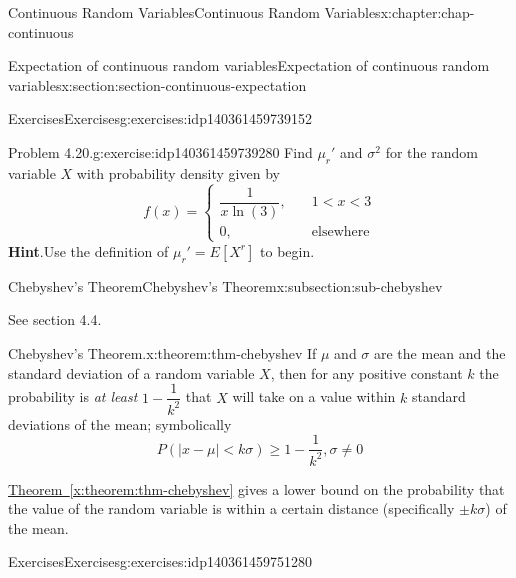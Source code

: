\documentclass[oneside,10pt,]{book}
\newcommand{\blocktitlefont}{\relax}
\newcommand{\xreffont}{\relax}
\numberwithin{equation}{section}
\newcommand{\lt}{<}
\newcommand{\amp}{&}
\begin{document}
\begin{chapterptx}{Continuous Random Variables}{}{Continuous Random Variables}{}{}{x:chapter:chap-continuous}
\begin{sectionptx}{Expectation of continuous random variables}{}{Expectation of continuous random variables}{}{}{x:section:section-continuous-expectation}
\typeout{************************************************}
%
\begin{exercises-subsection}{Exercises}{}{Exercises}{}{}{g:exercises:idp140361459739152}
\begin{divisionexercise}{1}{Problem 4.20.}{}{g:exercise:idp140361459739280}%
Find \(\mu_r'\) and \(\sigma^2\) for the random variable \(X\) with probability density given by%
\begin{equation*}
f(x) = \begin{cases}
\dfrac{1}{x\ln(3)}, \amp \quad 1 \lt x \lt 3\\
0, \amp \quad \text{elsewhere}\end{cases}
\end{equation*}
%
\textbf{\blocktitlefont Hint}.\quad{}Use the definition of \(\mu_r' = E[X^r]\) to begin.\end{divisionexercise}%
\end{exercises-subsection}
%
%
\typeout{************************************************}
\typeout{************************************************}
%
\begin{subsectionptx}{Chebyshev's Theorem}{}{Chebyshev's Theorem}{}{}{x:subsection:sub-chebyshev}
\begin{introduction}{}%
See section 4.4.%
\end{introduction}%
\begin{theorem}{Chebyshev's Theorem.}{}{x:theorem:thm-chebyshev}%
If \(\mu\) and \(\sigma\) are the mean and the standard deviation of a random variable \(X\), then for any positive constant \(k\) the probability is \emph{at least} \(1-\dfrac{1}{k^2}\) that \(X\) will take on a value within \(k\) standard deviations of the mean; symbolically%
\begin{equation*}
P(|x-\mu| \lt k\sigma) \ge 1 -
\dfrac{1}{k^2}, \sigma \ne 0
\end{equation*}
%
\end{theorem}
\hyperref[x:theorem:thm-chebyshev]{Theorem~{\xreffont\ref{x:theorem:thm-chebyshev}}} gives a lower bound on the probability that the value of the random variable is within a certain distance (specifically \(\pm k\sigma\)) of the mean.%
\end{subsectionptx}
%
%
\typeout{************************************************}
\typeout{************************************************}
%
\begin{exercises-subsection}{Exercises}{}{Exercises}{}{}{g:exercises:idp140361459751280}

\end{exercises-subsection}
\end{sectionptx}
\end{chapterptx}
\end{document}
